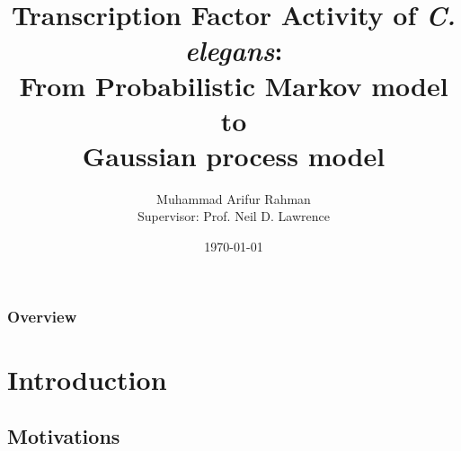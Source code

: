 \documentclass{beamer}
\title[Dynamic TFA of C.Elegans]{Transcription Factor Activity of \textit{C. elegans}: \\From Probabilistic Markov model to\\ Gaussian process model} %
\author{Muhammad Arifur Rahman \\ Supervisor: Prof. Neil D. Lawrence} %
\institute[SITraN] %
{
Department of Computer Science \\and\\ Sheffield Institute for Translational Neuroscience \\ The University of Sheffield \\ %
\medskip
\textit{M.Rahman@dcs.shef.ac.uk} %
}
\date{\today} %
\begin{document}
\begin{frame}
\titlepage %
\end{frame}

\begin{frame}
\frametitle{Overview} %
\tableofcontents %
\end{frame}


\section{Introduction} %

\subsection{Motivations} %

\end{document}
